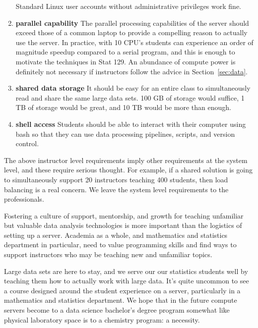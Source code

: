 \documentclass[12pt]{article}
\begin{document}
\begin{enumerate}
    Standard Linux user accounts without administrative privileges work fine.
\item \textbf{parallel capability}
    The parallel processing capabilities of the server should exceed those of a common laptop to provide a compelling reason to actually use the server.
    In practice, with 10 CPU's students can experience an order of magnitude speedup compared to a serial program, and this is enough to motivate the techniques in Stat 129.
    An abundance of compute power is definitely not necessary if instructors follow the advice in Section~\ref{sec:data}.
\item \textbf{shared data storage} It should be easy for an entire class to simultaneously read and share the same large data sets.
    100 GB of storage would suffice, 1 TB of storage would be great, and 10 TB would be more than enough.
\item \textbf{shell access} Students should be able to interact with their computer using bash so that they can use data processing pipelines, scripts, and version control.
\end{enumerate}

The above instructor level requirements imply other requirements at the system level, and these require serious thought.
For example, if a shared solution is going to simultaneously support 20 instructors teaching 400 students, then load balancing is a real concern.
We leave the system level requirements to the professionals.

Fostering a culture of support, mentorship, and growth for teaching unfamiliar but valuable data analysis technologies is more important than the logistics of setting up a server.
Academia as a whole, and mathematics and statistics department in particular, need to value programming skills and find ways to support instructors who may be teaching new and unfamiliar topics.

Large data sets are here to stay, and we serve our our statistics students well by teaching them how to actually work with large data.
It's quite uncommon to see a course designed around the student experience on a server, particularly in a mathematics and statistics department.
We hope that in the future compute servers become to a data science bachelor's degree program somewhat like physical laboratory space is to a chemistry program: a necessity.




\end{document}

